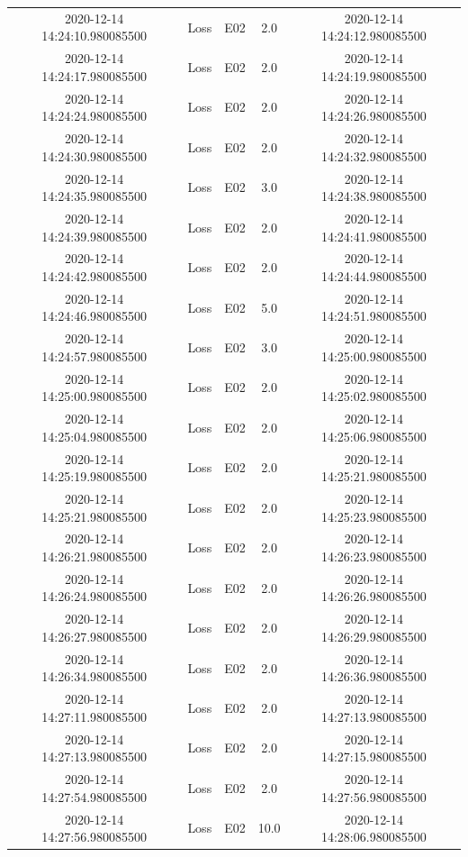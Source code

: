 \begin{enumerate}
\begin{longtabu}{ccccc}
2020{-}12{-}14 14:24:10.980085500&Loss&E02&2.0&2020{-}12{-}14 14:24:12.980085500\\%
2020{-}12{-}14 14:24:17.980085500&Loss&E02&2.0&2020{-}12{-}14 14:24:19.980085500\\%
2020{-}12{-}14 14:24:24.980085500&Loss&E02&2.0&2020{-}12{-}14 14:24:26.980085500\\%
2020{-}12{-}14 14:24:30.980085500&Loss&E02&2.0&2020{-}12{-}14 14:24:32.980085500\\%
2020{-}12{-}14 14:24:35.980085500&Loss&E02&3.0&2020{-}12{-}14 14:24:38.980085500\\%
2020{-}12{-}14 14:24:39.980085500&Loss&E02&2.0&2020{-}12{-}14 14:24:41.980085500\\%
2020{-}12{-}14 14:24:42.980085500&Loss&E02&2.0&2020{-}12{-}14 14:24:44.980085500\\%
2020{-}12{-}14 14:24:46.980085500&Loss&E02&5.0&2020{-}12{-}14 14:24:51.980085500\\%
2020{-}12{-}14 14:24:57.980085500&Loss&E02&3.0&2020{-}12{-}14 14:25:00.980085500\\%
2020{-}12{-}14 14:25:00.980085500&Loss&E02&2.0&2020{-}12{-}14 14:25:02.980085500\\%
2020{-}12{-}14 14:25:04.980085500&Loss&E02&2.0&2020{-}12{-}14 14:25:06.980085500\\%
2020{-}12{-}14 14:25:19.980085500&Loss&E02&2.0&2020{-}12{-}14 14:25:21.980085500\\%
2020{-}12{-}14 14:25:21.980085500&Loss&E02&2.0&2020{-}12{-}14 14:25:23.980085500\\%
2020{-}12{-}14 14:26:21.980085500&Loss&E02&2.0&2020{-}12{-}14 14:26:23.980085500\\%
2020{-}12{-}14 14:26:24.980085500&Loss&E02&2.0&2020{-}12{-}14 14:26:26.980085500\\%
2020{-}12{-}14 14:26:27.980085500&Loss&E02&2.0&2020{-}12{-}14 14:26:29.980085500\\%
2020{-}12{-}14 14:26:34.980085500&Loss&E02&2.0&2020{-}12{-}14 14:26:36.980085500\\%
2020{-}12{-}14 14:27:11.980085500&Loss&E02&2.0&2020{-}12{-}14 14:27:13.980085500\\%
2020{-}12{-}14 14:27:13.980085500&Loss&E02&2.0&2020{-}12{-}14 14:27:15.980085500\\%
2020{-}12{-}14 14:27:54.980085500&Loss&E02&2.0&2020{-}12{-}14 14:27:56.980085500\\%
2020{-}12{-}14 14:27:56.980085500&Loss&E02&10.0&2020{-}12{-}14 14:28:06.980085500\\%

\end{longtabu}
\end{enumerate}
